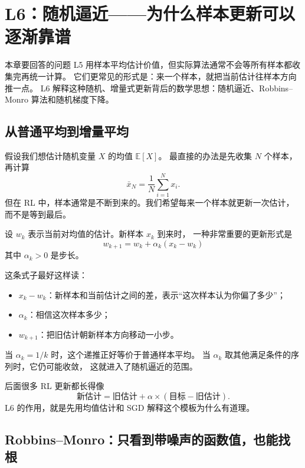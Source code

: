 \documentclass[11pt,a4paper,fontset=fandol]{ctexart}
\newcommand{\E}{\mathbb{E}}
\begin{document}
\section{L6：随机逼近——为什么样本更新可以逐渐靠谱}

\begin{goalbox}{本章要回答的问题}
L5 用样本平均估计价值，但实际算法通常不会等所有样本都收集完再统一计算。
它们更常见的形式是：来一个样本，就把当前估计往样本方向推一点。
L6 解释这种随机、增量式更新背后的数学思想：随机逼近、Robbins--Monro
算法和随机梯度下降。
\end{goalbox}

\subsection{从普通平均到增量平均}

假设我们想估计随机变量 \(X\) 的均值 \(\E[X]\)。
最直接的办法是先收集 \(N\) 个样本，再计算
\[
\bar x_N=\frac{1}{N}\sum_{i=1}^{N}x_i.
\]
但在 RL 中，样本通常是不断到来的。我们希望每来一个样本就更新一次估计，
而不是等到最后。

设 \(w_k\) 表示当前对均值的估计。新样本 \(x_k\) 到来时，
一种非常重要的更新形式是
\[
\boxed{
w_{k+1}=w_k+\alpha_k(x_k-w_k)
}
\]
其中 \(\alpha_k>0\) 是步长。

这条式子最好这样读：

\begin{itemize}
  \item \(x_k-w_k\)：新样本和当前估计之间的差，表示“这次样本认为你偏了多少”；
  \item \(\alpha_k\)：相信这次样本多少；
  \item \(w_{k+1}\)：把旧估计朝新样本方向移动一小步。
\end{itemize}

当 \(\alpha_k=1/k\) 时，这个递推正好等价于普通样本平均。
当 \(\alpha_k\) 取其他满足条件的序列时，它仍可能收敛，
这就进入了随机逼近的范围。

\begin{intuitionbox}
后面很多 RL 更新都长得像
\[
\text{新估计}
=
\text{旧估计}
+\alpha\times(\text{目标}-\text{旧估计}).
\]
L6 的作用，就是先用均值估计和 SGD 解释这个模板为什么有道理。
\end{intuitionbox}

\subsection{Robbins--Monro：只看到带噪声的函数值，也能找根}
\end{document}
